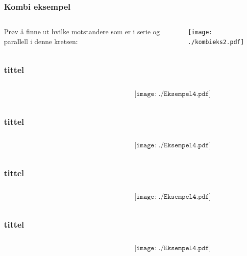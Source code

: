 \documentclass[aspectratio=169,xcolor=dvipsnames]{beamer}
\begin{document}
\begin{frame} \frametitle{Kombi eksempel}
	\begin{columns}
		\begin{column}{0.5\textwidth}
Prøv å finne ut hvilke motstandere som er i serie og parallell i denne
kretsen:


		\end{column}
		\begin{column}{0.5\textwidth}
			\texttt{[image: ./kombieks2.pdf]}
		\end{column}
	\end{columns}
\end{frame}

\begin{frame} \frametitle{tittel}
	\begin{columns}
		\begin{column}{0.5\textwidth}
			
		\end{column}
		\begin{column}{0.5\textwidth}
			$$\texttt{[image: ./Eksempel4.pdf]}$$
		\end{column}
	\end{columns}
\end{frame}

\begin{frame} \frametitle{tittel}
	\begin{columns}
		\begin{column}{0.5\textwidth}
			
		\end{column}
		\begin{column}{0.5\textwidth}
			$$\texttt{[image: ./Eksempel4.pdf]}$$
		\end{column}
	\end{columns}
\end{frame}

\begin{frame} \frametitle{tittel}
	\begin{columns}
		\begin{column}{0.5\textwidth}
			
		\end{column}
		\begin{column}{0.5\textwidth}
			$$\texttt{[image: ./Eksempel4.pdf]}$$
		\end{column}
	\end{columns}
\end{frame}

\begin{frame} \frametitle{tittel}
	\begin{columns}
		\begin{column}{0.5\textwidth}
			
		\end{column}
		\begin{column}{0.5\textwidth}
			$$\texttt{[image: ./Eksempel4.pdf]}$$
		\end{column}
	\end{columns}
\end{frame}
\end{document}
